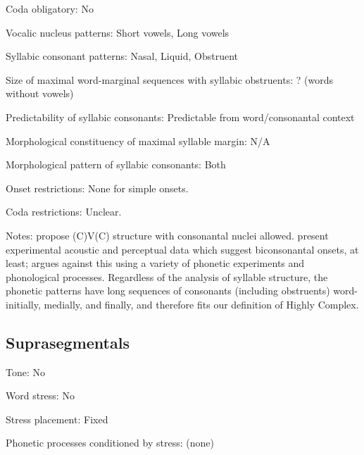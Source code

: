 {\begin{appendixdesc}
\item[Coda obligatory:] No

\item[Vocalic nucleus patterns:] Short vowels, Long vowels

\item[Syllabic consonant patterns:] Nasal, Liquid, Obstruent

\item[Size of maximal word-marginal sequences with syllabic obstruents:] ? (words without vowels)

\item[Predictability of syllabic consonants:] Predictable from word/consonantal context

\item[Morphological constituency of maximal syllable margin:] N/A

\item[Morphological pattern of syllabic consonants:] Both

\item[Onset restrictions:] None for simple onsets.

\item[Coda restrictions:] Unclear.

\item[Notes:] \citet{DellElmedlaoui2002} propose (C)V(C) structure with consonantal nuclei allowed. \citet{PuechLouali1999} present experimental acoustic and perceptual data which suggest biconsonantal onsets, at least; \citet{Ridouane2008} argues against this using a variety of phonetic experiments and phonological processes. Regardless of the analysis of syllable structure, the phonetic patterns have long sequences of consonants (including obstruents) word-initially, medially, and finally, and therefore fits our definition of Highly Complex.
\end{appendixdesc}
\subsection*{Suprasegmentals}
\begin{appendixdesc}
\item[Tone:] No

\item[Word stress:] No

\item[Stress placement:] Fixed

\item[Phonetic processes conditioned by stress:] (none)


\end{appendixdesc}}
